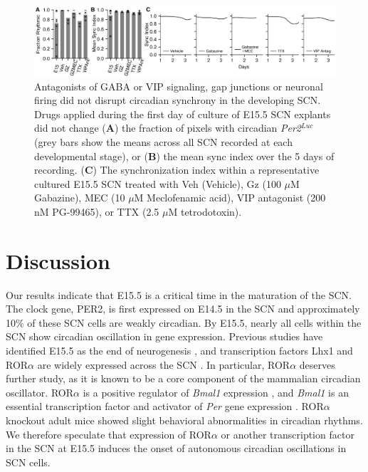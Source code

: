 \begin{figure}[!p]
    \begin{center}
        \includegraphics[width=6.5in]{chap4/figures/Figure7.png}
    \end{center}
    \caption{\label{fig:vc7} Antagonists of GABA or VIP signaling, gap junctions or neuronal firing did not disrupt circadian synchrony in the developing SCN. Drugs applied during the first day of culture of E15.5 SCN explants did not change (\textbf{A}) the fraction of pixels with circadian \textit{Per2}$^{Luc}$ (grey bars show the means across all SCN recorded at each developmental stage), or (\textbf{B}) the mean sync index over the 5 days of recording. (\textbf{C}) The synchronization index within a representative cultured E15.5 SCN treated with Veh (Vehicle), Gz (100 $\mu$M Gabazine), MEC (10 $\mu$M Meclofenamic acid), VIP antagonist (200 nM PG-99465), or TTX (2.5  $\mu$M tetrodotoxin).
    }
\end{figure}

\clearpage
\section{Discussion}

Our results indicate that E15.5 is a critical time in the maturation of the SCN.
The clock gene, PER2, is first expressed on E14.5 in the SCN and approximately 10\% of these SCN cells are weakly circadian.
By E15.5, nearly all cells within the SCN show circadian oscillation in gene expression.
Previous studies have identified E15.5 as the end of neurogenesis \cite{Shimada1973, Kabrita2008, Shimogori2010}, and transcription factors Lhx1 and ROR$\alpha$ are widely expressed across the SCN \cite{VanDunk2011}.
In particular, ROR$\alpha$ deserves further study, as it is known to be a core component of the mammalian circadian oscillator.
ROR$\alpha$ is a positive regulator of \textit{Bmal1} expression \cite{Sato2004}, and \textit{Bmal1} is an essential transcription factor and activator of \textit{Per} gene expression \cite{Hastings2014, Takahashi2016}.
ROR$\alpha$ knockout adult mice showed slight behavioral abnormalities in circadian rhythms.
We therefore speculate that expression of ROR$\alpha$ or another transcription factor in the SCN at E15.5 induces the onset of autonomous circadian oscillations in SCN cells.

